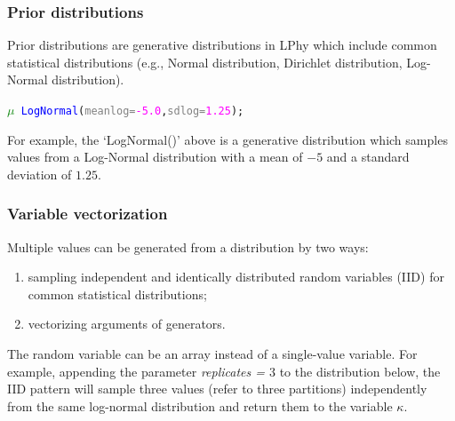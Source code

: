 \documentclass[10pt,letterpaper,table]{article}
\begin{document}
\subsubsection{Prior distributions}
Prior distributions are generative distributions in LPhy which include common statistical distributions (e.g., Normal distribution, Dirichlet distribution, Log-Normal distribution).  


{\small
\begin{alltt}
    \textcolor{green}{\(\mu\)} ~ \textcolor{blue}{LogNormal}(\textcolor{gray}{meanlog=}\textcolor{magenta}{-5.0}, \textcolor{gray}{sdlog=}\textcolor{magenta}{1.25});
\end{alltt}

For example, the `LogNormal()' above is a generative distribution which samples values from a Log-Normal distribution with a mean of $-5$ and a standard deviation of $1.25$. 
}


\subsubsection{Variable vectorization}

Multiple values can be generated from a distribution by two ways:

\begin{enumerate}
    \item sampling independent and identically distributed random variables (IID) for common statistical distributions;
    \item vectorizing arguments of generators.
\end{enumerate}

The random variable can be an array instead of a single-value variable. For example, appending the parameter \textit{replicates = $3$} to the distribution below, the IID pattern will sample three values (refer to three partitions) independently from the same log-normal distribution and return them to the variable $\kappa$.
\end{document}
